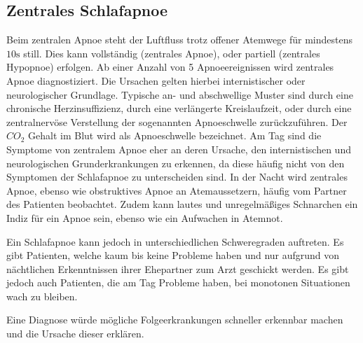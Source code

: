 \subsection{Zentrales Schlafapnoe}
Beim zentralen Apnoe steht der Luftfluss trotz offener Atemwege für mindestens $10\si{\s}$ still. Dies kann vollständig (zentrales Apnoe), oder partiell (zentrales Hypopnoe) erfolgen. 
Ab einer Anzahl von 5 Apnoeereignissen wird zentrales Apnoe diagnostiziert.
Die Ursachen gelten hierbei internistischer oder neurologischer Grundlage.
Typische an- und abschwellige Muster sind durch eine chronische Herzinsuffizienz, durch eine verlängerte Kreislaufzeit, oder durch eine zentralnervöse Verstellung der sogenannten Apnoeschwelle zurückzuführen.
Der $CO_2$ Gehalt im Blut wird als Apnoeschwelle bezeichnet.
Am Tag sind die Symptome von zentralem Apnoe eher an deren Ursache, den internistischen und neurologischen Grunderkrankungen zu erkennen, da diese häufig nicht von den Symptomen der Schlafapnoe zu unterscheiden sind. 
In der Nacht wird zentrales Apnoe, ebenso wie obstruktives Apnoe an Atemaussetzern, häufig vom Partner des Patienten beobachtet.
Zudem kann lautes und unregelmäßiges Schnarchen ein Indiz für ein Apnoe sein, ebenso wie ein Aufwachen in Atemnot.

Ein Schlafapnoe kann jedoch in unterschiedlichen Schweregraden auftreten. 
Es gibt Patienten, welche kaum bis keine Probleme haben und nur aufgrund von nächtlichen Erkenntnissen ihrer Ehepartner zum Arzt geschickt werden. 
Es gibt jedoch auch Patienten, die am Tag Probleme haben, bei monotonen Situationen wach zu bleiben.

Eine Diagnose würde mögliche Folgeerkrankungen schneller erkennbar machen und die Ursache dieser erklären.

